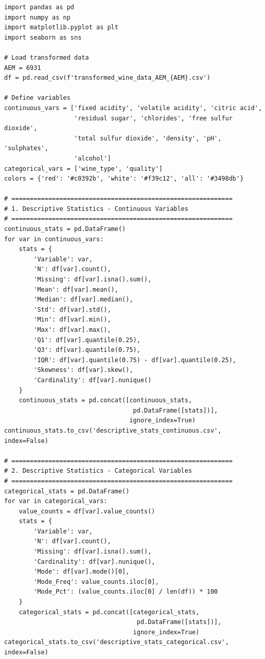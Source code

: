 \documentclass[12pt,a4paper]{article}
\begin{document}
\begin{lstlisting}
import pandas as pd
import numpy as np
import matplotlib.pyplot as plt
import seaborn as sns

# Load transformed data
AEM = 6931
df = pd.read_csv(f'transformed_wine_data_AEM_{AEM}.csv')

# Define variables
continuous_vars = ['fixed acidity', 'volatile acidity', 'citric acid',
                   'residual sugar', 'chlorides', 'free sulfur dioxide',
                   'total sulfur dioxide', 'density', 'pH', 'sulphates',
                   'alcohol']
categorical_vars = ['wine_type', 'quality']
colors = {'red': '#c0392b', 'white': '#f39c12', 'all': '#3498db'}

# ============================================================
# 1. Descriptive Statistics - Continuous Variables
# ============================================================
continuous_stats = pd.DataFrame()
for var in continuous_vars:
    stats = {
        'Variable': var,
        'N': df[var].count(),
        'Missing': df[var].isna().sum(),
        'Mean': df[var].mean(),
        'Median': df[var].median(),
        'Std': df[var].std(),
        'Min': df[var].min(),
        'Max': df[var].max(),
        'Q1': df[var].quantile(0.25),
        'Q3': df[var].quantile(0.75),
        'IQR': df[var].quantile(0.75) - df[var].quantile(0.25),
        'Skewness': df[var].skew(),
        'Cardinality': df[var].nunique()
    }
    continuous_stats = pd.concat([continuous_stats,
                                   pd.DataFrame([stats])],
                                  ignore_index=True)
continuous_stats.to_csv('descriptive_stats_continuous.csv', index=False)

# ============================================================
# 2. Descriptive Statistics - Categorical Variables
# ============================================================
categorical_stats = pd.DataFrame()
for var in categorical_vars:
    value_counts = df[var].value_counts()
    stats = {
        'Variable': var,
        'N': df[var].count(),
        'Missing': df[var].isna().sum(),
        'Cardinality': df[var].nunique(),
        'Mode': df[var].mode()[0],
        'Mode_Freq': value_counts.iloc[0],
        'Mode_Pct': (value_counts.iloc[0] / len(df)) * 100
    }
    categorical_stats = pd.concat([categorical_stats,
                                    pd.DataFrame([stats])],
                                   ignore_index=True)
categorical_stats.to_csv('descriptive_stats_categorical.csv', index=False)


\end{lstlisting}
\end{document}
